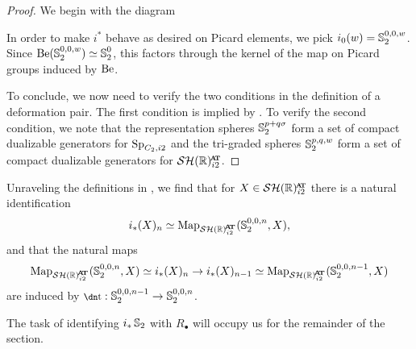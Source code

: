 \begin{proof}
  We begin with the diagram
  \begin{center}  \end{center}
  In order to make $i^*$ behave as desired on Picard elements, we pick
  $i_0(w) = \operatorname{\mathbb{S}}_2^{0,0,w}$. Since $\mathrm{Be} (\operatorname{\mathbb{S}}_2^{0,0,w}) \simeq \operatorname{\mathbb{S}}_2^{0}$, this factors through the kernel of the map on Picard groups induced by $\mathrm{Be}$.

  To conclude, we now need to verify the two conditions in the definition of a deformation pair.
  The first condition is implied by .  
  To verify the second condition, we note that the representation spheres $\operatorname{\mathbb{S}}^{p+q\sigma} _2$ form a set of compact dualizable generators for $\operatorname{\mathrm{Sp}}_{C_2,i2}$ and the tri-graded spheres $\operatorname{\mathbb{S}}^{p,q,w} _2$ form a set of compact dualizable generators for $\SHRat$.
\end{proof}

\begin{rmk}
  Unraveling the definitions in , we find that for $X \in \SHRat$ there is a natural identification
  \[ i_* (X)_n \simeq \Map_{\SHRat} (\Ss_2 ^{0,0,n}, X), \]
  and that the natural maps
  \[ \Map_{\SHRat} (\Ss_2 ^{0,0,n}, X) \simeq i_* (X)_n \to i_* (X)_{n-1} \simeq \Map_{\SHRat} (\Ss_2 ^{0,0,n-1}, X) \]
  are induced by $\ta : \Ss^{0,0,n-1} _2 \to \Ss^{0,0,n} _2$.
\end{rmk}

The task of identifying $i_*\operatorname{\mathbb{S}}_2$ with $R_\bullet$ will occupy us for the remainder of the section.







